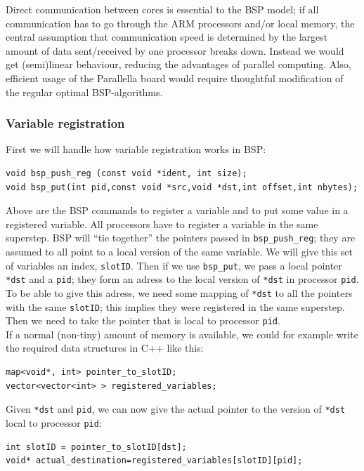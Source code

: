 \documentclass[fleqn]{article}
\renewcommand{\(}{\left(}
\renewcommand{\)}{\right)}
\begin{document}
Direct communication between cores is essential to the BSP model; if all communication has to go through the ARM processors and/or local memory, the central assumption that communication speed is determined by the largest amount of data sent/received by one processor breaks down. Instead we would get (semi)linear behaviour, reducing the advantages of parallel computing. Also, efficient usage of the Parallella board would require thoughtful modification of the regular optimal BSP-algorithms. 

\subsubsection{Variable registration}
First we will handle how variable registration works in BSP:
\\
\begin{lstlisting}
void bsp_push_reg (const void *ident, int size);
void bsp_put(int pid,const void *src,void *dst,int offset,int nbytes);
\end{lstlisting}
Above are the BSP commands to register a variable and to put some value in a registered variable.
All processors have to register a variable in the same superstep. BSP will ``tie together'' the pointers passed in \texttt{bsp\_push\_reg}; they are assumed to all point to a local version of the same variable. We will give this set of variables an index, \texttt{slotID}. Then if we use \texttt{bsp\_put}, we pass a local pointer \texttt{*dst} and a \texttt{\texttt{pid}}; they form an adress to the local version of \texttt{*dst} in processor \texttt{pid}. To be able to give this adress, we need some mapping of \texttt{*dst} to all the pointers with the same \texttt{slotID}; this implies they were registered in the same superstep. Then we need to take the pointer that is local to processor \texttt{pid}.
\\
If a normal (non-tiny) amount of memory is available, we could for example write the required data structures in C++ like this:
\begin{lstlisting}
map<void*, int> pointer_to_slotID;
vector<vector<int> > registered_variables;
\end{lstlisting}
Given \texttt{*dst} and \texttt{pid}, we can now give the actual pointer to the version of \texttt{*dst} local to processor \texttt{pid}:
\begin{lstlisting}
int slotID = pointer_to_slotID[dst];
void* actual_destination=registered_variables[slotID][pid];
\end{lstlisting}
\end{document}
